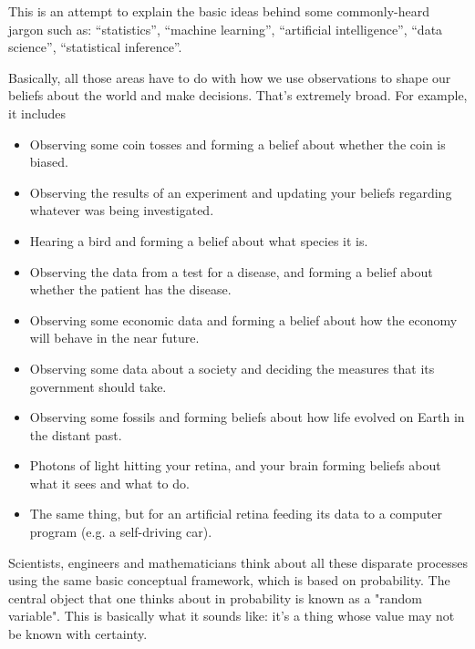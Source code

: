 This is an attempt to explain the basic ideas behind some commonly-heard jargon such as: ``statistics​'', ``machine
learning​'', ``artificial intelligence​'', ``data science​'', ``statistical inference​​​''.

Basically, all those areas have to do with how we use observations to shape our beliefs about the world and make decisions. That's extremely broad. For example, it includes
\begin{itemize}
\item Observing some coin tosses and forming a belief about whether the coin is biased.
\item Observing the results of an experiment and updating your beliefs regarding whatever was being investigated.
\item Hearing a bird and forming a belief about what species it is.
\item Observing the data from a test for a disease, and forming a belief about whether the patient has the disease.
\item Observing some economic data and forming a belief about how the economy will behave in the near future.
\item Observing some data about a society and deciding the measures that its government should take.
\item Observing some fossils and forming beliefs about how life evolved on Earth in the distant past.
\item Photons of light hitting your retina, and your brain forming beliefs about what it sees and what to do.
\item The same thing, but for an artificial retina feeding its data to a computer program (e.g. a self-driving car).
\end{itemize}
Scientists, engineers and mathematicians think about all these disparate processes using the same basic conceptual framework, which is based on probability. The central object that one thinks about in probability is known as a "random variable". This is basically what it sounds like: it's a thing whose value may not be known with certainty.

